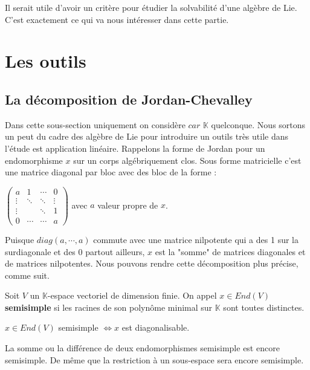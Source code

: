 \documentclass[a4paper,openany,12pt]{report}
\newcommand{\KK}{\mathbb{K}}
\theoremstyle{break}
{\theorembodyfont{\upshape}
\newtheorem*{rmq}{Remarque :}
\newtheorem*{prv}{Preuve :}
\newtheorem*{ex}{Exemples :}
\newtheorem{exe}{Exemple : }
\newtheorem*{nota}{Notation :}}
\begin{document}
\quad Il serait utile d'avoir un critère pour étudier la solvabilité d'une algèbre de Lie. C'est exactement ce qui va nous intéresser dans cette partie. 

\section{Les outils}

\subsection{La décomposition de Jordan-Chevalley}

\quad Dans cette sous-section uniquement on considère $car$ $\KK$ quelconque. Nous sortons un peut du cadre des algèbre de Lie pour introduire un outils très utile dans l’étude est application linéaire. Rappelons la forme de Jordan pour un endomorphisme $x$ sur un corps algébriquement clos. Sous forme matricielle c'est une matrice diagonal par bloc avec des bloc de la forme :
\begin{center}
$
\begin{pmatrix}
a & 1 & \cdots & 0 \\
\vdots & \ddots & \ddots & \vdots \\
 \vdots & & \ddots & 1 \\
0 & \cdots & \cdots & a
\end{pmatrix}
$ avec $a$ valeur propre de $x$.
\end{center}
\quad Puisque $diag(a, \cdots, a)$ commute avec une matrice nilpotente qui a des 1 sur la surdiagonale et des 0 partout ailleurs, $x$ est la "somme" de matrices diagonales et de matrices nilpotentes. Nous pouvons rendre cette décomposition plus précise, comme suit. 

\begin{df}
\quad Soit $V$ un $\KK$-espace vectoriel de dimension finie. On appel $x \in End(V)$ \textbf{semisimple} si les racines de son polynôme minimal sur $\KK$ sont toutes distinctes. 
\end{df}

\begin{prop}
\quad $x \in End(V)$ semisimple $\iff x$ est diagonalisable. 
\end{prop}

\begin{rmq}
\quad La somme ou la différence de deux endomorphismes semisimple est encore semisimple. De même que la restriction à un sous-espace sera encore semisimple.
\end{rmq}
\end{document}
